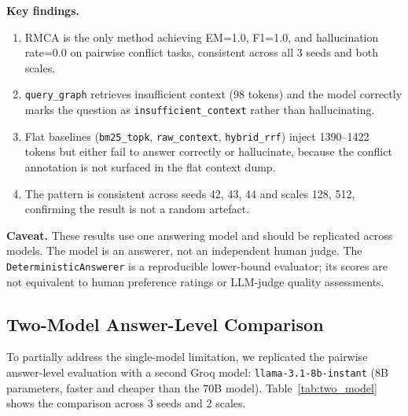 \documentclass[conference]{IEEEtran}
\begin{document}
\textbf{Key findings.}
\begin{enumerate}
\item RMCA is the only method achieving EM=1.0, F1=1.0, and hallucination rate=0.0 on
pairwise conflict tasks, consistent across all 3 seeds and both scales.
\item \texttt{query\_graph} retrieves insufficient context (98 tokens) and the model
correctly marks the question as \texttt{insufficient\_context} rather than hallucinating.
\item Flat baselines (\texttt{bm25\_topk}, \texttt{raw\_context}, \texttt{hybrid\_rrf})
inject 1390--1422 tokens but either fail to answer correctly or hallucinate, because the
conflict annotation is not surfaced in the flat context dump.
\item The pattern is consistent across seeds 42, 43, 44 and scales 128, 512, confirming
the result is not a random artefact.
\end{enumerate}

\textbf{Caveat.} These results use one answering model and should be replicated across
models. The model is an answerer, not an independent human judge. The
\texttt{DeterministicAnswerer} is a reproducible lower-bound evaluator; its scores are not
equivalent to human preference ratings or LLM-judge quality assessments.

\subsection{Two-Model Answer-Level Comparison}

To partially address the single-model limitation, we replicated the pairwise answer-level
evaluation with a second Groq model: \texttt{llama-3.1-8b-instant} (8B parameters, faster
and cheaper than the 70B model). Table~\ref{tab:two_model} shows the comparison across
3 seeds and 2 scales.
\end{document}
